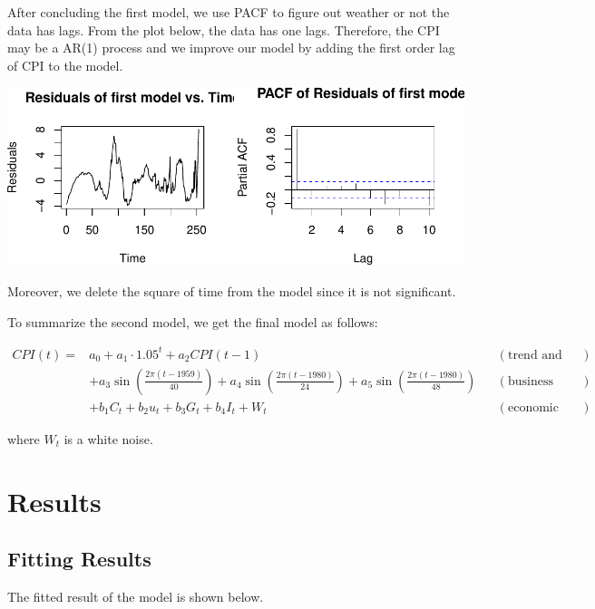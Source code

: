 \documentclass[
  man,floatsintext,
  man]{apa6}
\begin{document}
After concluding the first model, we use PACF to figure out weather or not the data has lags.
From the plot below, the data has one lags.
Therefore, the CPI may be a AR(1) process
and we improve our model by adding the first order lag of CPI to the model.

\includegraphics{stat429_group2_final_proj_files/figure-latex/unnamed-chunk-4-1.pdf}

Moreover, we delete the square of time from the model since it is not significant.

To summarize the second model, we get the final model as follows:

\begin{align*}
CPI(t) =& a_0 + a_1 \cdot 1.05^t + a_2 CPI(t-1)  && (\text{trend and lags})\\
& + a_3 \sin\left(\frac{2\pi(t-1959)}{40}\right) + a_4 \sin\left(\frac{2\pi(t-1980)}{24}\right) + a_5 \sin\left(\frac{2\pi(t-1980)}{48}\right) && (\text{business cycle})\\
& + b_1 C_t + b_2 u_t + b_3 G_t + b_4 I_t + W_t && (\text{economic variables})
\end{align*}

where \(W_t\) is a white noise.

\hypertarget{results}{%
\section{Results}\label{results}}

\hypertarget{fitting-results}{%
\subsection{Fitting Results}\label{fitting-results}}

The fitted result of the model is shown below.
\end{document}
